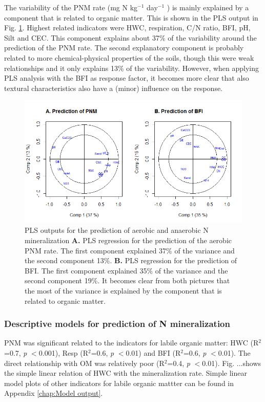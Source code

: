 \documentclass[10pt,twoside,dutch,english]{report}
\begin{document}
The variability of the PNM rate (mg N kg$^{-1} $ day$^{-1}$ ) is mainly explained by a component that is related to organic matter. This is shown in the PLS output in Fig. \ref{fig:results_pls}. Highest related indicators were HWC, respiration, C/N ratio, BFI, pH, Silt and CEC. This component explains about 37\% of the variability around the prediction of the PNM rate. The second explanatory component is probably related to more chemical-physical properties of the soils, though this were weak relationships and it only explains 13\% of the variability. However, when applying PLS analysis with the BFI as response factor, it becomes more clear that also textural characteristics also have a (minor) influence on the response. 
	\begin{figure}[h] %
	\includegraphics[width=1\linewidth]{results_pls_pnmbfi}
	\caption{PLS outputs for the prediction of aerobic and anaerobic N mineralization \textbf{A.} PLS regression for the prediction of the aerobic PNM rate. The first component explained 37\% of the variance and the second component 13\%. \textbf{B.} PLS regression for the prediction of BFI. The first component explained 35\% of the variance and the second component 19\%. It becomes clear from both pictures that the most of the variance is explained by the component that is related to organic matter.}
	\label{fig:results_pls}
\end{figure}


\subsubsection{Descriptive models for prediction of N mineralization}
PNM was significant related to the indicators for labile organic matter: HWC (R$^{2}$=0.7, \textit{p} $<$0.001), Resp (R$^{2}$=0.6, \textit{p} $<$0.01) and BFI (R$^{2}$=0.6, \textit{p} $<$0.01). The direct relationship with OM was relatively poor (R$^{2}$=0.4, \textit{p} $<$0.01). Fig. ...shows the simple linear relation of HWC with the mineralization rate. Simple linear model plots of other indicators for labile organic mattter can be found in Appendix \ref{chap:Model output}.
\end{document}

